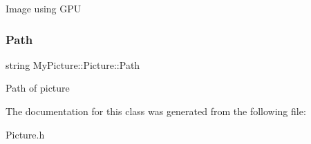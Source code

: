 Image using G\+PU \mbox{\label{class_my_picture_1_1_picture_a7917ba800ec5284d496f744004c8b6ff}} 
\subsubsection{\texorpdfstring{Path}{Path}}
{\footnotesize\ttfamily string My\+Picture\+::\+Picture\+::\+Path\hspace{0.3cm}{\ttfamily [private]}}

Path of picture 

The documentation for this class was generated from the following file\+:\begin{DoxyCompactItemize}
\item 
Picture.\+h\end{DoxyCompactItemize}
